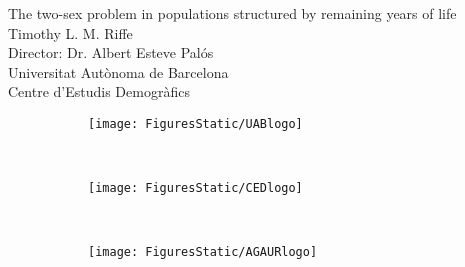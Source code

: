 \documentclass{beamer}
\begin{document}
\begin{frame}[plain]
\vspace{3em}
\LARGE The two-sex problem in populations structured by remaining years of life
\\
\vspace{1em}
\large Timothy L. M. Riffe \\
\vspace{1em}
\normalsize Director: Dr. Albert Esteve Pal\'{o}s \\
\vspace{1em}
Universitat Aut\`{o}noma de Barcelona \\ 
Centre d'Estudis Demogr\`{a}fics 
\vspace{5em}
\begin{figure}
        \centering
        \begin{subfigure}[b]{0.3\textwidth}
                \centering
                \texttt{[image: FiguresStatic/UABlogo]}
        \end{subfigure}%
        ~ %
        \begin{subfigure}[b]{0.3\textwidth}
                \centering
                \texttt{[image: FiguresStatic/CEDlogo]}
        \end{subfigure}
        ~ %
        \begin{subfigure}[b]{0.3\textwidth}
                \centering
                \texttt{[image: FiguresStatic/AGAURlogo]}
        \end{subfigure}
\end{figure}
\end{frame}


\begin{frame}[allowframebreaks]
  
\end{frame}

\end{document}

